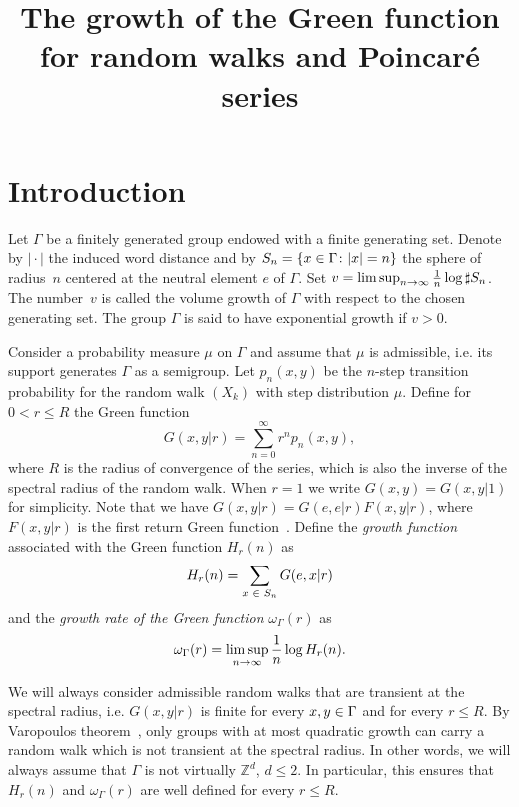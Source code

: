 \documentclass[AHL,Unicode,longabstracts]{cedram}
\title[The growth of the Green function and Poincaré series]{The growth of the Green function for random walks and Poincaré series}
\author[\initial{M.} \lastname{Dussaule}]{\firstname{Matthieu} \lastname{Dussaule}}
\author[\initial{L.} \lastname{Wang}]{\firstname{Longmin} \lastname{Wang}}
\author[\initial{W.} \lastname{Yang}]{\firstname{Wenyuan} \lastname{Yang}}
\newcommand{\Z}{\mathbb{Z}}
\let\originalleft\left
\let\originalright\right
\renewcommand{\left}{\mathopen{}\mathclose\bgroup\originalleft}
\renewcommand{\right}{\aftergroup\egroup\originalright}
\let\oldin\in
\renewcommand{\in}{\mathchoice{\oldin}{\oldin}{\,\oldin\,}{\,\oldin\,}}
\renewcommand*{\to}{\mathchoice{\longrightarrow}{\rightarrow}{\rightarrow}{\rightarrow}}
\begin{document}
\maketitle

\section{Introduction}


Let $\Gamma$ be a finitely generated group endowed with a finite generating set. Denote by $|\!\cdot\!|$ the induced word distance and by $S_n = \left\{ x \in \Gamma \colon |x| =n \right\}$ the sphere of radius~$n$ centered at the neutral element $e$ of $\Gamma$. Set $v=\limsup_{n\to\infty} \frac{1}{n}\log \sharp S_n$. The number~$v$ is called the volume growth of $\Gamma$ with respect to the chosen generating set. The group $\Gamma$ is said to have exponential growth if $v>0$.


Consider a probability measure $\mu$ on $\Gamma$ and assume that $\mu$ is admissible, i.e. its support generates $\Gamma$ as a semigroup. Let $p_n(x, y)$ be the $n$-step transition probability for the random walk $(X_k)$ with step distribution $\mu$. Define for $0 < r \leq R$ the Green function
\[
G(x, y | r) = \sum_{n = 0}^{\infty} r^n p_n(x, y),
\]
where $R$ is the radius of convergence of the series, which is also the inverse of the spectral radius of the random walk. When $r = 1$ we write $G(x, y) = G(x, y | 1)$ for simplicity. Note that we have $G(x, y | r) = G(e, e | r) F(x, y | r)$, where $F(x, y | r)$ is the first return Green function~\cite[Lemma~1.13]{Woessbook}. Define the \emph{growth function} associated with the Green function $H_r(n)$ as
\[
H_r(n) = \sum_{x \in S_n} G(e, x | r)
\]
and the \emph{growth rate of the Green function} $\omega_\Gamma(r)$ as
\[
\omega_{\Gamma}(r) = \limsup_{n \to \infty} \frac{1}{n} \log H_r(n).
\]

We will always consider admissible random walks that are transient at the spectral radius, i.e. $G(x,y|r)$ is finite for every $x,y\in \Gamma$ and for every $r\leq R$. By Varopoulos theorem~\cite[Theorem~7.8]{Woessbook}, only groups with at most quadratic growth can carry a random walk which is not transient at the spectral radius. In other words, we will always assume that $\Gamma$ is not virtually $\Z^d$, $d\leq 2$. In particular, this ensures that $H_r(n)$ and $\omega_\Gamma(r)$ are well defined for every $r\leq R$.
\end{document}
